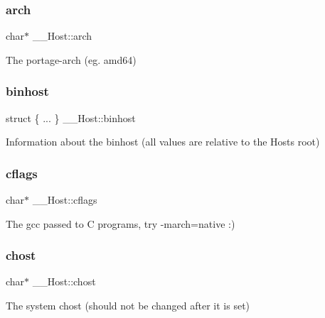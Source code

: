 \subsubsection{\texorpdfstring{arch}{arch}}
{\footnotesize\ttfamily char$\ast$ \+\_\+\+\_\+\+Host\+::arch}



The portage-\/arch (eg. amd64) 

\mbox{\label{struct_____host_adde139e84a9a3722fee6faab0978568f}} 
\subsubsection{\texorpdfstring{binhost}{binhost}}
{\footnotesize\ttfamily struct \{ ... \}   \+\_\+\+\_\+\+Host\+::binhost}



Information about the binhost (all values are relative to the Host\textquotesingle{}s root) 

\mbox{\label{struct_____host_a94121a0033331d7cdf5425e6d97a74ca}} 
\subsubsection{\texorpdfstring{cflags}{cflags}}
{\footnotesize\ttfamily char$\ast$ \+\_\+\+\_\+\+Host\+::cflags}



The gcc passed to C programs, try -\/march=native \+:) 

\mbox{\label{struct_____host_a73ffa5f9a5dbc9e987f5d804ebc320fa}} 
\subsubsection{\texorpdfstring{chost}{chost}}
{\footnotesize\ttfamily char$\ast$ \+\_\+\+\_\+\+Host\+::chost}



The system chost (should not be changed after it is set) 

